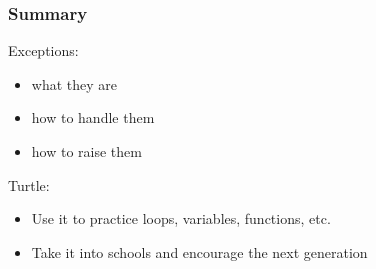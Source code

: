 \documentclass{beamer}
\begin{document}
\begin{frame}
\frametitle{Summary}
Exceptions:
\begin{itemize}
\item what they are
\item how to handle them
\item how to raise them
\end{itemize}

Turtle:
\begin{itemize}
\item Use it to practice loops, variables, functions, etc.
\item Take it into schools and encourage the next generation
\end{itemize}
\end{frame}
\end{document}
